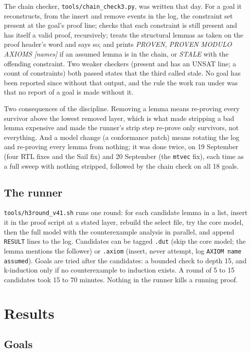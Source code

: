 \documentclass[11pt]{article}
\newcommand{\code}[1]{\texttt{#1}}
\begin{document}
The chain checker, \code{tools/chain\_check3.py}, was written that day. For a
goal it reconstructs, from the insert and remove events in the log, the
constraint set present at the goal's proof line; checks that each constraint
is still present and has itself a valid proof, recursively; treats the
structural lemmas as taken on the proof header's word and says so; and prints
\emph{PROVEN}, \emph{PROVEN MODULO AXIOMS [names]} if an assumed lemma is in
the chain, or \emph{STALE} with the offending constraint. Two weaker checkers
(present and has an UNSAT line; a count of constraints) both passed states
that the third called stale. No goal has been reported since without that
output, and the rule the work ran under was that no report of a goal is made
without it.

Two consequences of the discipline. Removing a lemma means re-proving every
survivor above the lowest removed layer, which is what made stripping a bad
lemma expensive and made the runner's strip step re-prove only survivors, not
everything. And a model change (a conformance patch) means rotating the log
and re-proving every lemma from nothing; it was done twice, on 19 September
(four RTL fixes and the Sail fix) and 20 September (the \code{mtvec} fix),
each time as a full sweep with nothing stripped, followed by the chain check
on all 18 goals.

\subsection{The runner}

\code{tools/h3round\_v41.sh} runs one round: for each candidate lemma in a
list, insert it in the proof script at a stated layer, rebuild the select file,
try the core model, then the full model with the counterexample analysis in
parallel, and append \code{RESULT} lines to the log. Candidates can be tagged
\code{.dut} (skip the core model; the lemma mentions the follower) or
\code{.axiom} (insert, never attempt, log \code{AXIOM name assumed}). Goals are
tried after the candidates: a bounded check to depth 15, and k-induction only
if no counterexample to induction exists. A round of 5 to 15 candidates took
15 to 70 minutes. Nothing in the runner kills a running proof.

\section{Results}

\subsection{Goals}
\end{document}
